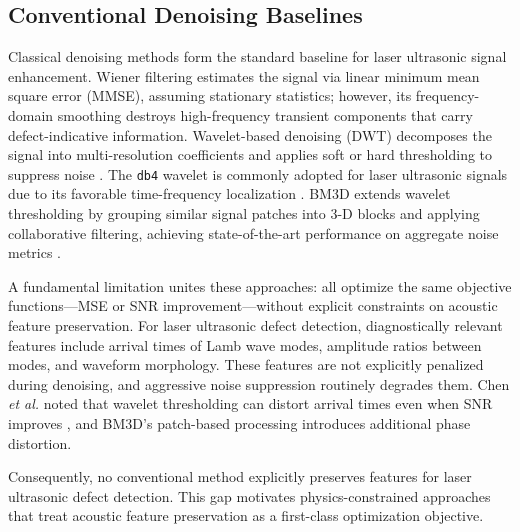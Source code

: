 \subsection{Conventional Denoising Baselines}
\label{sec:conventional-baselines}

Classical denoising methods form the standard baseline for laser ultrasonic signal enhancement. Wiener filtering estimates the signal via linear minimum mean square error (MMSE), assuming stationary statistics; however, its frequency-domain smoothing destroys high-frequency transient components that carry defect-indicative information. Wavelet-based denoising (DWT) decomposes the signal into multi-resolution coefficients and applies soft or hard thresholding to suppress noise \cite{chen2019wavelet}. The \texttt{db4} wavelet is commonly adopted for laser ultrasonic signals due to its favorable time-frequency localization \cite{chen2019wavelet}. BM3D extends wavelet thresholding by grouping similar signal patches into 3-D blocks and applying collaborative filtering, achieving state-of-the-art performance on aggregate noise metrics \cite{dabov2007bm3d}.

A fundamental limitation unites these approaches: all optimize the same objective functions---MSE or SNR improvement---without explicit constraints on acoustic feature preservation. For laser ultrasonic defect detection, diagnostically relevant features include arrival times of Lamb wave modes, amplitude ratios between modes, and waveform morphology. These features are not explicitly penalized during denoising, and aggressive noise suppression routinely degrades them. Chen \textit{et al.} noted that wavelet thresholding can distort arrival times even when SNR improves \cite{chen2019wavelet}, and BM3D's patch-based processing introduces additional phase distortion.

Consequently, no conventional method explicitly preserves features for laser ultrasonic defect detection. This gap motivates physics-constrained approaches that treat acoustic feature preservation as a first-class optimization objective.
